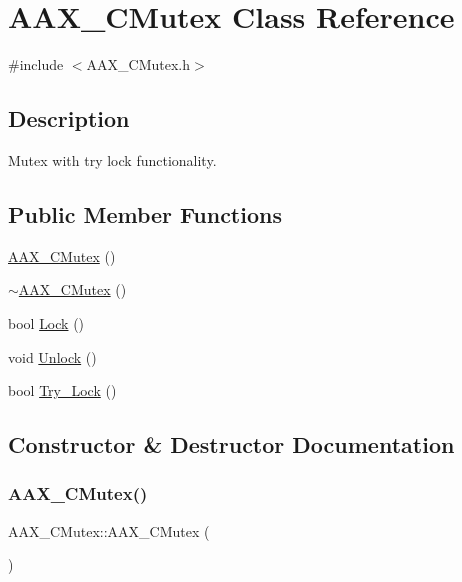 \hypertarget{a01501}{}\section{A\+A\+X\+\_\+\+C\+Mutex Class Reference}
\label{a01501}


{\ttfamily \#include $<$A\+A\+X\+\_\+\+C\+Mutex.\+h$>$}



\subsection{Description}
Mutex with try lock functionality. \subsection*{Public Member Functions}
\begin{DoxyCompactItemize}
\item 
\mbox{\hyperlink{a01501_a4660e81ede040465fb41613cc8ab1386}{A\+A\+X\+\_\+\+C\+Mutex}} ()
\item 
\mbox{\hyperlink{a01501_a0328e4cd9b148b80d477f3275ce3ff2a}{$\sim$\+A\+A\+X\+\_\+\+C\+Mutex}} ()
\item 
bool \mbox{\hyperlink{a01501_a99babc9bed7ae95c36015635f4c500df}{Lock}} ()
\item 
void \mbox{\hyperlink{a01501_a8c25bbd0e6030325a7965f8453d96323}{Unlock}} ()
\item 
bool \mbox{\hyperlink{a01501_afdc4af88dd8aca7acba0907f1cb5846f}{Try\+\_\+\+Lock}} ()
\end{DoxyCompactItemize}


\subsection{Constructor \& Destructor Documentation}
\mbox{\label{a01501_a4660e81ede040465fb41613cc8ab1386}} 
\subsubsection{\texorpdfstring{AAX\_CMutex()}{AAX\_CMutex()}}
{\footnotesize\ttfamily A\+A\+X\+\_\+\+C\+Mutex\+::\+A\+A\+X\+\_\+\+C\+Mutex (\begin{DoxyParamCaption}{ }\end{DoxyParamCaption})}

